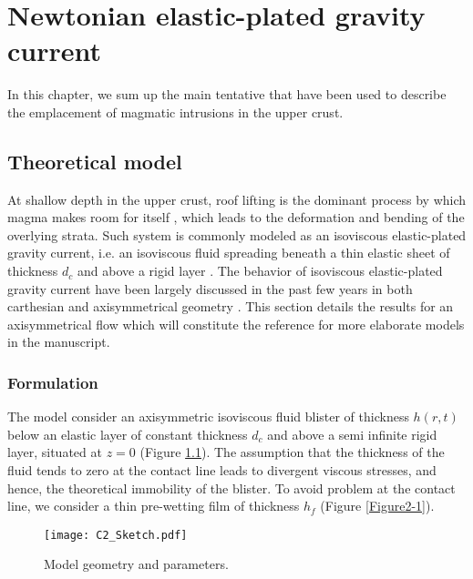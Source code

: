 \chapter{Newtonian elastic-plated gravity current} 
\label{chap2} 
\minitoc

In this chapter, we  sum up the main tentative that  have been used to
describe the emplacement of magmatic intrusions in the upper crust.

\section{Theoretical model}
\label{sec:model-1}

At shallow  depth in  the upper  crust, roof  lifting is  the dominant
process     by    which     magma     makes     room    for     itself
\citep{Johnson:1973ho,Pollard:1973ho}, which leads  to the deformation
and bending of the overlying  strata.  Such system is commonly modeled
as an  isoviscous elastic-plated gravity current,  i.e.  an isoviscous
fluid spreading  beneath a thin  elastic sheet of thickness  $d_c$ and
above   a  rigid   layer  \citep{Michaut:2011kg,Bunger:2011cb}.    The
behavior  of  isoviscous  elastic-plated  gravity  current  have  been
largely  discussed   in  the  past   few  years  in   both  carthesian
\citep{Michaut:2011kg,Bunger:2011cb,Anonymous:QWXp_4JV}            and
axisymmetrical  geometry  \citep{Michaut:2013dr,Lister:2013ia}.   This
section  details the  results for  an axisymmetrical  flow which  will
constitute the reference for more elaborate models in the manuscript.

\subsection{Formulation}
\label{sec:formulation-1}

The  model  consider  an  axisymmetric  isoviscous  fluid  blister  of
thickness $h(r,t)$ below an elastic  layer of constant thickness $d_c$
and above a semi infinite rigid layer, situated at $z=0$ \citep{Michaut:2011kg} (Figure
\ref{C2-Sketch}).   The assumption  that  the thickness  of the  fluid
tends to zero at the contact line leads to divergent viscous stresses,
and hence, the theoretical immobility of the blister. To avoid problem
at the contact line, we consider  a thin pre-wetting film of thickness
$h_f$ \citep{Flitton:1999iv,Lister:2013ia} (Figure \ref{Figure2-1}).

\begin{figure}[htbp]
  \begin{center}
    \graphicspath{ {/Users/thorey/Documents/These/Manuscript/Figure/Chapter2/} }
    \texttt{[image: C2\_Sketch.pdf]}
    \caption{Model geometry and parameters.}
    \label{C2-Sketch}
  \end{center}
\end{figure}

